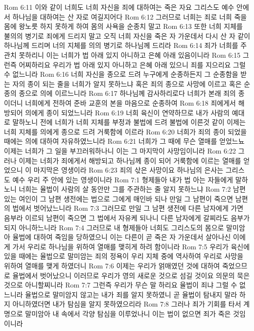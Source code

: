 Rom 6:11  이와 같이 너희도 너희 자신을 죄에 대하여는 죽은 자요 그리스도 예수 안에서 하나님을 대하여는 산 자로 여길지어다
Rom 6:12  그러므로 너희는 죄로 너희 죽을 몸에 왕노릇 하지 못하게 하여 몸의 사욕을 순종치 말고
Rom 6:13  또한 너희 지체를 불의의 병기로 죄에게 드리지 말고 오직 너희 자신을 죽은 자 가운데서 다시 산 자 같이 하나님께 드리며 너의 지체를 의의 병기로 하나님께 드리라
Rom 6:14  죄가 너희를 주관치 못하리니 이는 너희가 법 아래 있지 아니하고 은혜 아래 있음이니라
Rom 6:15  그런즉 어찌하리요 우리가 법 아래 있지 아니하고 은혜 아래 있으니 죄를 지으리요 그럴 수 없느니라
Rom 6:16  너희 자신을 종으로 드려 누구에게 순종하든지 그 순종함을 받는 자의 종이 되는 줄을 너희가 알지 못하느냐 혹은 죄의 종으로 사망에 이르고 혹은 순종의 종으로 의에 이르느니라
Rom 6:17  하나님께 감사하리로다 너희가 본래 죄의 종이더니 너희에게 전하여 준바 교훈의 본을 마음으로 순종하여
Rom 6:18  죄에게서 해방되어 의에게 종이 되었느니라
Rom 6:19  너희 육신이 연약하므로 내가 사람의 예대로 말하노니 전에 너희가 너희 지체를 부정과 불법에 드려 불법에 이른것 같이 이제는 너희 지체를 의에게 종으로 드려 거룩함에 이르라
Rom 6:20  너희가 죄의 종이 되었을 때에는 의에 대하여 자유하였느니라
Rom 6:21  너희가 그 때에 무슨 열매를 얻었느뇨 이제는 너희가 그 일을 부끄러워하나니 이는 그 마지막이 사망임이니라
Rom 6:22  그러나 이제는 너희가 죄에게서 해방되고 하나님께 종이 되어 거룩함에 이르는 열매를 얻었으니 이 마지막은 영생이라
Rom 6:23  죄의 삯은 사망이요 하나님의 은사는 그리스도 예수 우리 주 안에 있는 영생이니라
Rom 7:1  형제들아 내가 법 아는 자들에게 말하노니 너희는 율법이 사람의 살 동안만 그를 주관하는 줄 알지 못하느냐
Rom 7:2  남편 있는 여인이 그 남편 생전에는 법으로 그에게 매인바 되나 만일 그 남편이 죽으면 남편의 법에서 벗어났느니라
Rom 7:3  그러므로 만일 그 남편 생전에 다른 남자에게 가면 음부라 이르되 남편이 죽으면 그 법에서 자유케 되나니 다른 남자에게 갈찌라도 음부가 되지 아니하느니라
Rom 7:4  그러므로 내 형제들아 너희도 그리스도의 몸으로 말미암아 율법에 대하여 죽임을 당하였으니 이는 다른이 곧 죽은 자 가운데서 살아나신 이에게 가서 우리로 하나님을 위하여 열매를 맺히게 하려 함이니라
Rom 7:5  우리가 육신에 있을 때에는 율법으로 말미암는 죄의 정욕이 우리 지체 중에 역사하여 우리로 사망을 위하여 열매를 맺게 하였더니
Rom 7:6  이제는 우리가 얽매였던 것에 대하여 죽었으므로 율법에서 벗어났으니 이러므로 우리가 영의 새로운 것으로 섬길 것이요 의문의 묵은 것으로 아니할찌니라
Rom 7:7  그런즉 우리가 무슨 말 하리요 율법이 죄냐 그럴 수 없느니라 율법으로 말미암지 않고는 내가 죄를 알지 못하였니 곧 율법이 탐내지 말라 하지 아니하였더면 내가 탐심을 알지 못하였으리라
Rom 7:8  그러나 죄가 기회를 타서 계명으로 말미암아 내 속에서 각양 탐심을 이루었나니 이는 법이 없으면 죄가 죽은 것임이니라
